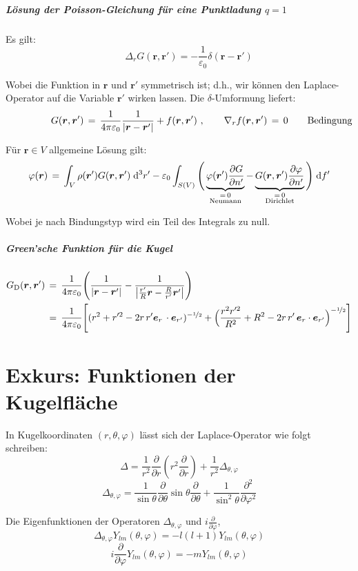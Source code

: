 \documentclass[titlepage,11pt,a4paper,ngerman]{report}
\newcommand{\vphi}{\varphi}
\newcommand{\dd}{\mathrm{d}}
\renewcommand{\vec}[1]{\boldsymbol{#1}}
\renewcommand{\epsilon}{\varepsilon}
\begin{document}
\subparagraph{Lösung der Poisson-Gleichung für eine Punktladung $q = 1$} Es gilt:
\[\qquad \Delta_r G(\vec{r},\vec{r}')=-\frac{1}{\epsilon_0}\delta(\vec{r}-\vec{r}')\]

Wobei die Funktion in $\vec{r}$ und $\vec{r}'$ symmetrisch ist; d.h., wir können den Laplace-Operator auf die Variable $\vec{r}'$ wirken lassen. Die $\delta$-Umformung liefert:
\[G(\vec{r},\vec{r}')\,=\,\frac{1}{4\pi\epsilon_0}\frac{1}{\left|\vec{r}-\vec{r}'\right|}+f(\vec{r},\vec{r}')\ ,\qquad \nabla_r f(\vec{r},\vec{r}')\,=\,0\qquad\rlap{Bedingung}\]

Für $\vec{r}\in V$ allgemeine Lösung gilt:
\[\varphi(\vec{r})\,=\,\int_V\rho(\vec{r}')G(\vec{r},\vec{r}')\;\dd^3r'-\epsilon_0\int_{S(V)}\Bigg(\underbrace{\varphi(\vec{r}')\frac{\partial G}{\partial n'}}_{\mathclap{\substack{{=\,0}\\{\text{Neumann}}}}}-\underbrace{G(\vec{r},\vec{r}')\frac{\partial\varphi}{\partial n'}}_{\mathclap{\substack{{=\,0}\\{\text{Dirichlet}}}}}\Bigg)\;\dd f'\]

Wobei je nach Bindungstyp wird ein Teil des Integrals zu null.

\subparagraph{Green'sche Funktion für die Kugel}
\begin{align*}
G_\mathrm{D}(\vec{r},\vec{r}')\,&=\,\frac{1}{4\pi\epsilon_0}\Bigg(\frac{1}{\left|\vec{r}-\vec{r}'\right|}-\frac{1}{\left|\frac{r'}{R}\vec{r}-\frac{R}{r'}\vec{r}'\right|}\Bigg)\\
&=\,\frac{1}{4\pi\epsilon_0}\Bigg[ (r^2+r'^2-2r\,r'\vec{e}_r\,\cdot\vec{e}_{r'})^{-\nicefrac{1}{2}}+\Big( \frac{r^2r'^2}{R^2}+R^2-2r\,r'\,\vec{e}_r\cdot\vec{e}_{r'} \Big)^{-\nicefrac{1}{2}} \Bigg]
\end{align*}

\pagebreak
\section{Exkurs: Funktionen der Kugelfläche}
In Kugelkoordinaten $(r,\theta,\varphi)$ lässt sich der Laplace-Operator wie folgt schreiben:
\[\Delta=\frac{1}{r^2}\frac{\partial}{\partial r}\left(r^2\frac{\partial}{\partial r}\right)+\frac{1}{r^2}\Delta_{\theta,\vphi}\]
\[\Delta_{\theta,\vphi}=\frac{1}{\sin\theta}\frac{\partial}{\partial\theta}\sin\theta\frac{\partial}{\partial\theta}+\frac{1}{\sin^2\theta}\frac{\partial^2}{\partial\vphi^2}\]
\noindent

Die Eigenfunktionen der Operatoren $\Delta_{\theta,\varphi}$ und $i\frac{\partial}{\partial\varphi}$,
\[\Delta_{\theta,\vphi}Y_{lm}(\theta,\vphi)=-l(l+1)Y_{lm}(\theta,\vphi)\]
\[i\frac{\partial}{\partial\vphi}Y_{lm}(\theta,\vphi)=-mY_{lm}(\theta,\vphi)\]
\end{document}
